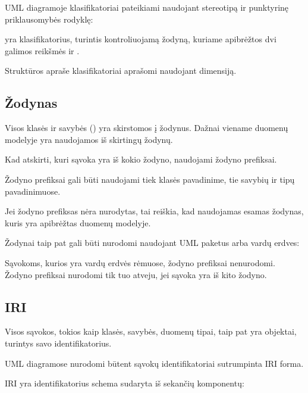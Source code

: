 \documentclass[letterpaper,10pt,lithuanian]{sphinxmanual}
\begin{document}
\sphinxAtStartPar
UML diagramoje klasifikatoriai pateikiami naudojant 
stereotipą ir punktyrinę priklausomybės rodyklę:

\sphinxAtStartPar
{} yra klasifikatorius, turintis kontroliuojamą žodyną,
kuriame apibrėžtos dvi galimos reikšmės  ir .

\sphinxAtStartPar
Struktūros apraše klasifikatoriai aprašomi naudojant {\hyperref[\detokenize{dimensijos:module-enum}]{}} dimensiją.


\subsection{Žodynas}
\label{\detokenize{modelis:zodynas}}
\sphinxAtStartPar
Visos klasės ir savybės () yra skirstomos į žodynus. Dažnai
viename duomenų modelyje yra naudojamos  iš skirtingų
žodynų.

\sphinxAtStartPar
Kad atskirti, kuri sąvoka yra iš kokio žodyno, naudojami žodyno prefiksai.

\sphinxAtStartPar
Žodyno prefiksai gali būti naudojami tiek klasės pavadinime, tie savybių ir
tipų pavadinimuose.

\sphinxAtStartPar
Jei žodyno prefiksas nėra nurodytas, tai reiškia, kad naudojamas esamas
žodynas, kuris yra apibrėžtas duomenų modelyje.

\sphinxAtStartPar
Žodynai taip pat gali būti nurodomi naudojant UML paketus arba vardų erdves:

\sphinxAtStartPar
Sąvokoms, kurios yra vardų erdvės rėmuose, žodyno prefiksai nenurodomi. Žodyno
prefiksai nurodomi tik tuo atveju, jei sąvoka yra iš kito žodyno.


\subsection{IRI}
\label{\detokenize{modelis:iri}}
\sphinxAtStartPar
Visos sąvokos, tokios kaip klasės, savybės, duomenų tipai, taip pat yra
objektai, turintys savo identifikatorius.

\sphinxAtStartPar
UML diagramose nurodomi būtent sąvokų identifikatoriai sutrumpinta IRI forma.

\sphinxAtStartPar
IRI yra identifikatorius schema sudaryta iš sekančių komponentų:
\end{document}
